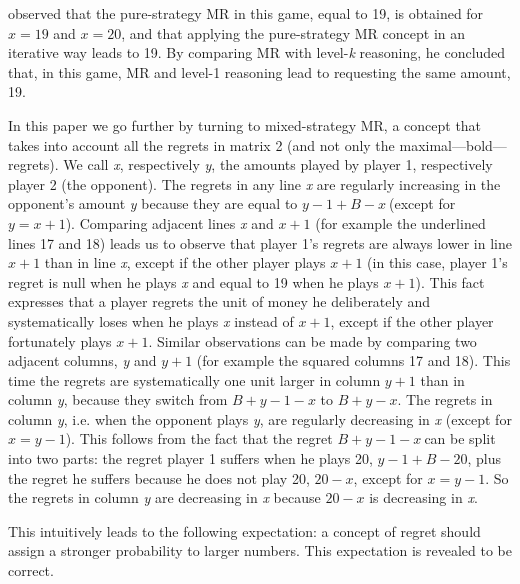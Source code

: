 \begin{Article}
\begin{refsection}[Umbhauer]
\textcite{garciapola2020} observed that the pure-strategy MR in this game,
equal to 19, is obtained for \(x = 19\) and \(x = 20\), and that
applying the pure-strategy MR concept in an iterative way \parencite{halpern2012} leads to 19. By comparing MR with level-\emph{k} reasoning,
he concluded that, in this game, MR and level-1 reasoning lead to
requesting the same amount, 19.

In this paper we go further by turning to mixed-strategy MR, a concept
that takes into account all the regrets in matrix 2 (and not only the
maximal---bold--- regrets). We call \emph{x}, respectively \emph{y}, the
amounts played by player 1, respectively player 2 (the opponent). The
regrets in any line \emph{x} are regularly increasing in the opponent's
amount \emph{y} because they are equal to \(y - 1 + B - x\ \)(except for
\(y = x + 1\)). Comparing adjacent lines \emph{x} and \(x + 1\) (for
example the underlined lines 17 and 18) leads us to observe that player
1's regrets are always lower in line \(x + 1\) than in line \emph{x},
except if the other player plays \(x + 1\) (in this case, player 1's
regret is null when he plays \emph{x} and equal to 19 when he plays
\(x + 1\)). This fact expresses that a player regrets the unit of money
he deliberately and systematically loses when he plays \emph{x} instead
of \(x + 1\), except if the other player fortunately plays \(x + 1\).
Similar observations can be made by comparing two adjacent columns,
\emph{y} and \(y + 1\) (for example the squared columns 17 and 18). This
time the regrets are systematically one unit larger in column \(y + 1\)
than in column \emph{y}, because they switch from \(B + y - 1 - x\) to
\(B + y - x\). The regrets in column \emph{y}, i.e. when the opponent
plays \emph{y}, are regularly decreasing in \emph{x} (except for
\(x = y - 1\)). This follows from the fact that the regret
\(B + y - 1 - x\ \)can be split into two parts: the regret player 1
suffers when he plays 20, \(y - 1 + B - 20\), plus the regret he suffers
because he does not play 20, \(20 - x\), except for \(x = y - 1\). So
the regrets in column \emph{y} are decreasing in \emph{x} because
\(20 - x\) is decreasing in \emph{x}.

This intuitively leads to the following expectation: a concept of regret
should assign a stronger probability to larger numbers. This expectation
is revealed to be correct.


\end{refsection}
\end{Article}
